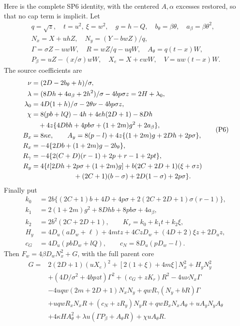 Here is the complete SP6 identity, with the centered $A,\alpha$
excesses restored, so that no cap term is implicit. Let
\[
\begin{gathered}
 q=\sqrt z,\quad t=u^2,\ \xi=w^2,\quad g=h-Q,
 \quad b_\theta=\beta\theta,\quad a_\beta=\beta\theta^2,\\
 N_x=X+uhZ,\quad N_y=(Y-bwZ)/q,\\
 \Gamma=\sigma Z-uwW,\quad R=wZ/q-uqW,
 \quad A_\theta=q(t-x)W,\\
 P_\beta=uZ-(x/\sigma)wW,\quad X_e=X+ewW,\quad
 V=uw(t-x)W.
\end{gathered}                                                   \tag{P5}
\]
The source coefficients are
\[
\begin{split}
 \nu&=(2D-2b_\theta+h)/\sigma,\\
 \lambda&=(8Dh+4a_\beta+2h^2)/\sigma-4bp\sigma z
            =2H+\lambda_0,\\
 \lambda_0&=4D(1+h)/\sigma-2\theta\nu-4bp\sigma z,\\
 \chi&=8(pb+lQ)-4h+4eh(2D+1)-8Dh\\
      &\quad+4z\{4Dbh+4pb\sigma+(1+2m)g^2+2a_\beta\},\\
 B_x&=8\kappa e,\qquad
 A_y=8(p-l)+4z\{(1+2m)g+2Dh+2p\sigma\},\\
 R_x&=-4\{2Db+(1+2m)g-2b_\theta\},\\
 R_\gamma&=-4\{2(C+D)(r-1)+2p+r-1+2pt\},\\
 R_y&=4\{t[2Dh+2p\sigma+(1+2m)g]
       +b(2C+2D+1)(\xi+\sigma z)\\
      &\hspace{22mm}+(2C+1)(b-\sigma)+2D(1-\sigma)+2p\sigma\}.
\end{split}                                                     \tag{P6}
\]
Finally put
\[
\begin{split}
 k_0&=2b\{(2C+1)b+4D+4p\sigma
                 +2(2C+2D+1)\sigma(r-1)\},\\
 k_1&=2(1+2m)g^2+8Dhb+8pb\sigma+4a_\beta,\\
 k_2&=2b^2(2C+2D+1),\qquad K_r=k_0+k_1t+k_2\xi,\\
 H_y&=4D_u(aD_w+\ell)+4mtz+4CzD_w+(4D+2)\xi z+2D_uz,\\
 c_G&=4D_u(pbD_w+lQ),\qquad c_N=8D_u(pD_w-l).
\end{split}                                                     \tag{P7}
\]
Then $F_w=4\beta D_wN_x^2+G$, with the full parent core
\[
\begin{split}
 G={}&2(2D+1)(uX_e)^2+[2(1+\xi)+4m\xi]N_x^2+H_yN_y^2\\
 &+(4D/\sigma^2+4bpzt)\Gamma^2+(c_G+zK_r)R^2
                -4u\nu N_x\Gamma\\
 &-4uqw(2m+2D+1)N_xN_y
      +qwR_\gamma(N_y+bR)\Gamma\\
 &+uqwR_xN_xR+(c_N+zR_y)N_yR
           +qwB_xN_xA_\theta+uA_yN_yA_\theta\\
 &+4\kappa H A_\theta^2
       +\lambda u(\Gamma P_\beta+A_\theta R)+\chi uA_\theta R.
\end{split}                                                     \tag{SP6}
\]
